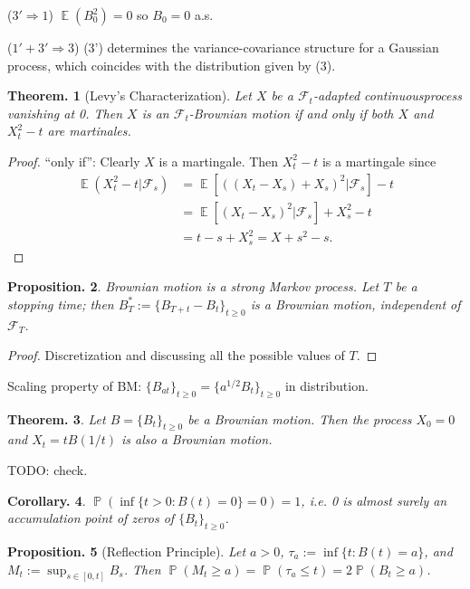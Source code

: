 \documentclass[11pt, a4paper]{memoir}
\newcommand{\imp}[2]{($#1\Rightarrow#2$)\hspace{0.2cm}}
\theoremstyle{change}
\newtheorem{theorem}{Theorem.}[section]
\newtheorem{corollary}[theorem]{Corollary.}
\newtheorem{proposition}[theorem]{Proposition.}
\theoremstyle{plain}
\theoremstyle{nonumberplain}
\newtheorem{proof}{Proof}
\DeclareMathOperator{\pr}{{\mathbb{P}}}
\DeclareMathOperator{\E}{{\mathbb{E}}}
\numberwithin{equation}{section}
\begin{document}
\imp{3'}{1}
$\E(B_0^2)=0$ so $B_0=0$ a.s.

\imp{1'+3'}{3}
(3') determines the variance-covariance structure for a Gaussian process, which coincides with the distribution given by (3).
\begin{theorem}[Levy's Characterization]
    Let $X$ be a $\mathcal{F}_t$-adapted continuousprocess vanishing at 0.
    Then $X$ is an $\mathcal{F}_t$-Brownian motion if and only if both $X$ and $X_t^2-t$ are martinales.
\end{theorem}
\begin{proof}
    ``only if'': Clearly $X$ is a martingale.
    Then $X_t^2-t$ is a martingale since
    \begin{align*}
        \E(X_t^2-t|\mathcal{F}_s)&=\E[((X_t-X_s)+X_s)^2|\mathcal{F}_s]-t\\
                                 &=\E[(X_t-X_s)^2|\mathcal{F}_s]+X_s^2-t\\
                                 &=t-s+X_s^2=X+s^2-s.
    \end{align*}
\end{proof}
\begin{proposition}
    Brownian motion is a strong Markov process.
    Let $T$ be a stopping time; then $B_T^*:=\{B_{T+t}-B_t\}_{t\geq 0}$ is a Brownian motion, independent of $\mathcal{F}_T$.
\end{proposition}
\begin{proof}
    Discretization and discussing all the possible values of $T$.
\end{proof}
Scaling property of BM: $\{B_{at}\}_{t\geq 0}=\{a^{1/2}B_t\}_{t\geq 0}$ in distribution.
\begin{theorem}
    Let $B=\{B_t\}_{t\geq 0}$ be a Brownian motion.
    Then the process $X_0=0$ and $X_t=tB(1/t)$ is also a Brownian motion.
\end{theorem}
TODO: check.
\begin{corollary}
    $\pr(\inf\{t>0:B(t)=0\}=0)=1$, i.e. 0 is almost surely an accumulation point of zeros of $\{B_t\}_{t\geq 0}$.
\end{corollary}
\begin{proposition}[Reflection Principle]
    Let $a>0$, $\tau_a:=\inf\{t:B(t)=a\}$, and $M_t:=\sup_{s\in[0,t]}B_s$.
    Then $\pr(M_t\geq a)=\pr(\tau_a\leq t)=2\pr(B_t\geq a)$.
\end{proposition}
\end{document}
